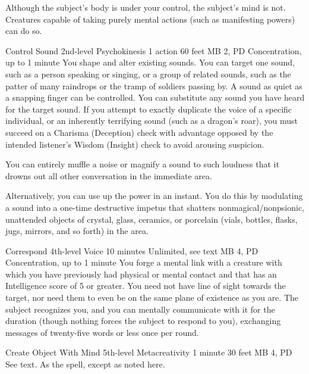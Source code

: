   Although the subject's body is under your control,
  the subject's mind is not.
  Creatures capable of taking purely mental actions
  (such as manifesting powers)
  can do so.

\DndPowerHeader%
  {Control Sound}
  {2nd-level Psychokinesis}
  {1 action}
  {60 feet}
  {MB 2, PD \lvltwo}
  {Concentration, up to 1 minute}
  You shape and alter existing sounds.
  You can target one sound,
  such as a person speaking or singing,
  or a group of related sounds,
  such as the patter of many raindrops
  or the tramp of soldiers passing by.
  A sound as quiet as a snapping finger can be controlled.
  You can substitute any sound you have heard
  for the target sound.
  If you attempt to exactly duplicate the voice
  of a specific individual,
  or an inherently terrifying sound (such as a dragon's roar),
  you must succeed on a
  Charisma (Deception) check with advantage
  opposed by the intended listener's Wisdom (Insight) check
  to avoid arousing suspicion.

  You can entirely muffle a noise or magnify a sound
  to such loudness that it drowns out
  all other conversation in the immediate area.
  
  Alternatively, you can use up the power in an instant.
  You do this by modulating a sound into a one-time
  destructive impetus that shatters nonmagical/nonpsionic,
  unattended objects of crystal, glass, ceramics, or porcelain
  (vials, bottles, flasks, jugs, mirrors, and so forth)
  in the area.

\DndPowerHeader%
  {Correspond}
  {4th-level Voice}
  {10 minutes}
  {Unlimited, see text}
  {MB 4, PD \lvlfour}
  {Concentration, up to 1 minute}
  You forge a mental link with a creature with which you have
  previously had physical or mental contact
  and that has an Intelligence score of 5 or greater.
  You need not have line of sight towards the target,
  nor need them to even be on the same
  plane of existence as you are.
  The subject recognizes you, and you can mentally communicate
  with it for the duration
  (though nothing forces the subject to respond to you),
  exchanging messages of twenty-five words or less once per round.

\DndPowerHeader%
  {Create Object With Mind}
  {5th-level Metacreativity}
  {1 minute}
  {30 feet}
  {MB 4, PD \lvlfive}
  {See text.}
As the  spell,
except as noted here.

